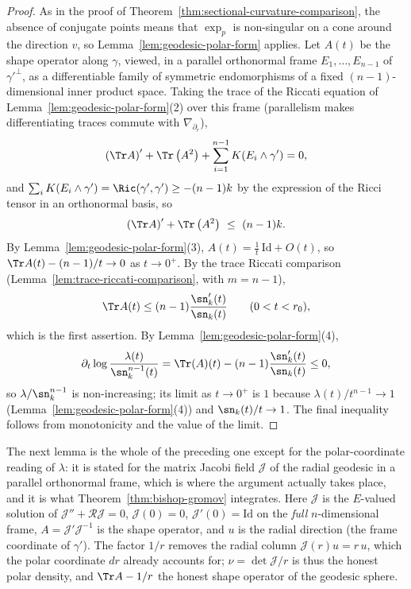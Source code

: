 %
\begin{proof}
As in the proof of Theorem~\ref{thm:sectional-curvature-comparison},
the absence of conjugate points means that $\exp_p$ is
non-singular on a cone around the direction $v$, so
Lemma~\ref{lem:geodesic-polar-form} applies. Let $A(t)$ be the shape
operator along $\gamma$, viewed, in a parallel orthonormal frame
$E_1,\ldots,E_{n-1}$ of $\gamma'^\perp$, as a differentiable family
of symmetric endomorphisms of a fixed $(n-1)$-dimensional inner
product space. Taking the trace of the Riccati equation of
Lemma~\ref{lem:geodesic-polar-form}(2) over this frame (parallelism
makes differentiating traces commute with $\nabla_{\partial_r}$),
$$\left(\Tr A\right)'+\Tr\left(A^2\right)
+\sum_{i=1}^{n-1}K(E_i\wedge\gamma')=0,$$
and $\sum_iK(E_i\wedge\gamma')=\Ric(\gamma',\gamma')\ge-(n-1)k$ by
the expression of the Ricci tensor in an orthonormal basis, so
$$\left(\Tr A\right)'+\Tr\left(A^2\right)\ \le\ (n-1)k.$$
By Lemma~\ref{lem:geodesic-polar-form}(3), $A(t)=\frac1t\,
\mathrm{Id}+O(t)$, so $\Tr A(t)-(n-1)/t\to0$ as $t\to0^+$. By the
trace Riccati comparison
(Lemma~\ref{lem:trace-riccati-comparison}, with $m=n-1$),
$$\Tr A(t)\le(n-1)\frac{\sn_k'(t)}{\sn_k(t)}\qquad(0<t<r_0),$$
which is the first assertion. By
Lemma~\ref{lem:geodesic-polar-form}(4),
$$\partial_t\log\frac{\lambda(t)}{\sn_k^{n-1}(t)}
=\Tr(A)(t)-(n-1)\frac{\sn_k'(t)}{\sn_k(t)}\le0,$$
so $\lambda/\sn_k^{n-1}$ is non-increasing; its limit as $t\to0^+$
is $1$ because $\lambda(t)/t^{n-1}\to1$
(Lemma~\ref{lem:geodesic-polar-form}(4)) and
$\sn_k(t)/t\to1$. The final inequality follows from monotonicity
and the value of the limit.
\end{proof}

The next lemma is the whole of the preceding one except for the
polar-coordinate reading of $\lambda$: it is stated for the matrix Jacobi
field $\mathcal J$ of the radial geodesic in a parallel orthonormal frame,
which is where the argument actually takes place, and it is what
Theorem~\ref{thm:bishop-gromov} integrates. Here $\mathcal J$ is the
$E$-valued solution of $\mathcal J''+\mathcal R\mathcal J=0$,
$\mathcal J(0)=0$, $\mathcal J'(0)=\mathrm{Id}$ on the \emph{full}
$n$-dimensional frame, $A=\mathcal J'\mathcal J^{-1}$ is the shape operator,
and $u$ is the radial direction (the frame coordinate of $\gamma'$). The
factor $1/r$ removes the radial column $\mathcal J(r)u=r\,u$, which the polar
coordinate $dr$ already accounts for; $\nu=\det\mathcal J/r$ is thus the
honest polar density, and $\Tr A-1/r$ the honest shape operator of the
geodesic sphere.

